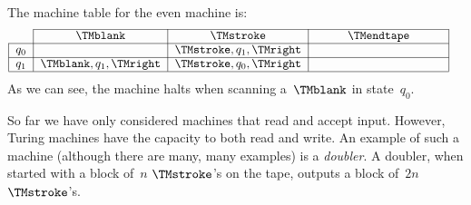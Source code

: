 \documentclass[../../../include/open-logic-section]{subfiles}
\begin{document}
\begin{ex}
The machine table for the even machine is:
\[
\centering
\begin{tabular}{lllll}
\cline{2-4}
\multicolumn{1}{l|}{}      & \multicolumn{1}{c|}{$\TMblank$}                
& \multicolumn{1}{c|}{$\TMstroke$}     & \multicolumn{1}{c|}{$\TMendtape$}   &  \\ \cline{1-4}
\multicolumn{1}{|l|}{$q_0$} & \multicolumn{1}{l|}{}                          
& \multicolumn{1}{l|}{\TMtrans{\TMstroke}{q_1}{\TMright}} & 
\multicolumn{1}{l|}{\phantom{\TMtrans{\TMstroke}{q_1}{\TMright}}} &  \\ \cline{1-4}
\multicolumn{1}{|l|}{$q_1$} & \multicolumn{1}{l|}{\TMtrans{\TMblank}{q_1}{\TMright}} 
& \multicolumn{1}{l|}{\TMtrans{\TMstroke}{q_0}{\TMright}} & 
\multicolumn{1}{l|}{\phantom{\TMtrans{\TMstroke}{q_1}{\TMright}}} &  \\ \cline{1-4}
\end{tabular}
\]
As we can see, the machine halts when scanning a~$\TMblank$ in state~$q_0$.
\end{ex}

\begin{explain}
So far we have only considered machines that read and accept input.
However, Turing machines have the capacity to both read and write. An
example of such a machine (although there are many, many examples) is
a \emph{doubler}. A doubler, when started with a block of~$n$
$\TMstroke$'s on the tape, outputs a block of~$2n$ $\TMstroke$'s.
\end{explain}
\end{document}
